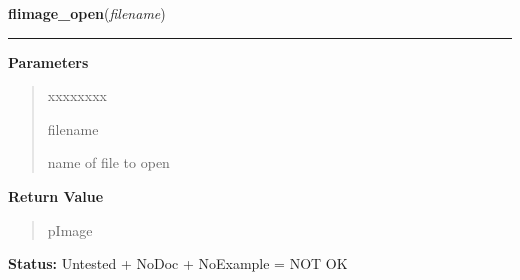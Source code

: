 \hspace{.8\funcindent}\begin{boxedminipage}{\funcwidth}

    \raggedright \textbf{flimage\_open}(\textit{filename})

    \vspace{-1.5ex}

    \rule{\textwidth}{0.5\fboxrule}
\setlength{\parskip}{2ex}
\setlength{\parskip}{1ex}
      \textbf{Parameters}
      \vspace{-1ex}

      \begin{quote}
        \begin{Ventry}{xxxxxxxx}

          \item[filename]

          name of file to open

        \end{Ventry}

      \end{quote}

      \textbf{Return Value}
    \vspace{-1ex}

      \begin{quote}
      pImage

      \end{quote}

\textbf{Status:} Untested + NoDoc + NoExample = NOT OK



    \end{boxedminipage}

    \label{xformslib:library:flimage_read_annotation}

    \vspace{0.5ex}

